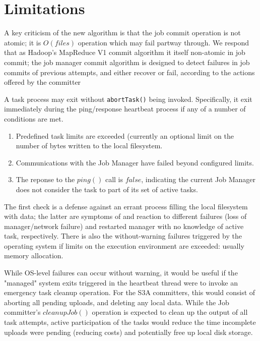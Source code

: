 \documentclass[conference]{IEEEtran}
\begin{document}

\section{Limitations}
\label{sec:limitations}

A key criticism of the new algorithm is that the job commit operation is not atomic;
it is $O(files)$ operation which may fail partway through.
We respond that as Hadoop's MapReduce V1 commit algorithm it itself non-atomic in job commit;
the job manager commit algorithm is designed to detect failures in job commits
of previous attempts, and either recover or fail, according to the actions
offered by the committer

A task process may exit without \texttt{abortTask()} being invoked.
Specifically, it exit immediately during the ping/response
heartbeat process if any of a number of conditions are met.

\begin{enumerate}
  \item Predefined task limits are exceeded
  (currently an optional limit on the number of bytes written to the local filesystem.
  \item Communications with the Job Manager have failed beyond configured limits.
  \item The reponse to the $ping()$ call is $false$, indicating the current
  Job Manager does not consider the task to part of its set of active tasks.
\end{enumerate}

The first check is a defense against an errant process filling the local
filesystem with data;
the latter are symptoms of and reaction to different failures (loss of manager/network failure)
and restarted manager with no knowledge of active task, respectively.
There is also the without-warning failures triggered by the operating system
if limits on the execution environment are exceeded: usually memory allocation.

While OS-level failures can occur without warning, it would be useful if the
"managed" system exits triggered in the heartbeat thread were to invoke
an emergency task cleanup operation.
For the S3A committers, this would consist of aborting all pending uploads, and
deleting any local data.
While the Job committer's $cleanupJob()$ operation is expected to clean up
the output of all task attempts, active participation of the tasks would
reduce the time incomplete uploads were pending (reducing costs) and
potentially free up local disk storage.
\end{document}

